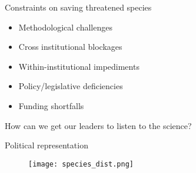 \documentclass{beamer}
\begin{document}
\begin{frame}{Constraints on saving threatened species} %
\begin{itemize}
    \item<2-> Methodological challenges
    \item<2-> Cross institutional blockages
    \item<2-> Within-institutional impediments
    \item<2-> Policy/legislative deficiencies
    \item<2-> Funding shortfalls
\end{itemize}
\end{frame}

\begin{frame}{} %
How can we get our leaders to listen to the science?
\end{frame}

\begin{frame}{Political representation} %
    \begin{figure}
        \texttt{[image: species\_dist.png]}
    \end{figure}
\end{frame}
\end{document}
